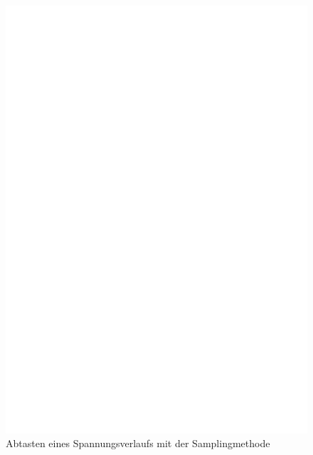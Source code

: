 \begin{figure}[H]
\centering
\includegraphics[width=18cm]{../FIG/sampling.eps}
\caption{Abtasten eines Spannungsverlaufs mit der Samplingmethode}
\label{fig:sampling}
\end{figure}


